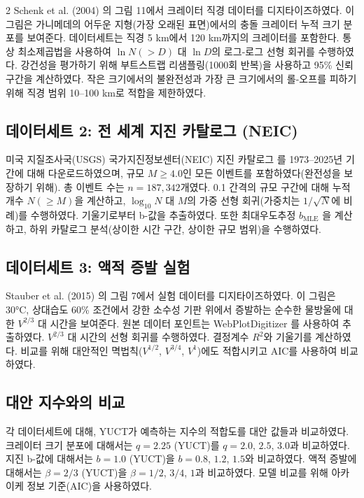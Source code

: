 \documentclass[11pt,a4paper]{article}
\begin{document}
\begin{multicols}{2}
		Schenk et al. (2004) \cite{Schenk2004}의 그림 11에서 크레이터 직경 데이터를 디지타이즈하였다. 이 그림은 가니메데의 어두운 지형(가장 오래된 표면)에서의 충돌 크레이터 누적 크기 분포를 보여준다. 데이터세트는 직경 5 km에서 120 km까지의 크레이터를 포함한다. 통상 최소제곱법을 사용하여 \(\ln N(>D)\) 대 \(\ln D\)의 로그-로그 선형 회귀를 수행하였다. 강건성을 평가하기 위해 부트스트랩 리샘플링(1000회 반복)을 사용하고 95\% 신뢰구간을 계산하였다. 작은 크기에서의 불완전성과 가장 큰 크기에서의 롤-오프를 피하기 위해 직경 범위 10–100 km로 적합을 제한하였다.
		
		\subsection{데이터세트 2: 전 세계 지진 카탈로그 (NEIC)}
		
		미국 지질조사국(USGS) 국가지진정보센터(NEIC) 지진 카탈로그 \cite{USGSNEIC}를 1973–2025년 기간에 대해 다운로드하였으며, 규모 \(M \ge 4.0\)인 모든 이벤트를 포함하였다(완전성을 보장하기 위해). 총 이벤트 수는 \(n = 187,342\)개였다. 0.1 간격의 규모 구간에 대해 누적 개수 \(N(\ge M)\)을 계산하고, \(\log_{10} N\) 대 \(M\)의 가중 선형 회귀(가중치는 \(1/\sqrt{N}\)에 비례)를 수행하였다. 기울기로부터 b-값을 추출하였다. 또한 최대우도추정 \(b_{\text{MLE}}\) \cite{Aki1965}을 계산하고, 하위 카탈로그 분석(상이한 시간 구간, 상이한 규모 범위)을 수행하였다.
		
		\subsection{데이터세트 3: 액적 증발 실험}
		
		Stauber et al. (2015) \cite{Stauber2015}의 그림 7에서 실험 데이터를 디지타이즈하였다. 이 그림은 30°C, 상대습도 60\% 조건에서 강한 소수성 기판 위에서 증발하는 순수한 물방울에 대한 \(V^{2/3}\) 대 시간을 보여준다. 원본 데이터 포인트는 WebPlotDigitizer \cite{WebPlotDigitizer}를 사용하여 추출하였다. \(V^{2/3}\) 대 시간의 선형 회귀를 수행하였다. 결정계수 \(R^2\)와 기울기를 계산하였다. 비교를 위해 대안적인 멱법칙(\(V^{1/2}\), \(V^{3/4}\), \(V^{1}\))에도 적합시키고 AIC를 사용하여 비교하였다.
		
		\subsection{대안 지수와의 비교}
		
		각 데이터세트에 대해, YUCT가 예측하는 지수의 적합도를 대안 값들과 비교하였다. 크레이터 크기 분포에 대해서는 \(q = 2.25\) (YUCT)를 \(q = 2.0\), \(2.5\), \(3.0\)과 비교하였다. 지진 b-값에 대해서는 \(b = 1.0\) (YUCT)을 \(b = 0.8\), \(1.2\), \(1.5\)와 비교하였다. 액적 증발에 대해서는 \(\beta = 2/3\) (YUCT)을 \(\beta = 1/2\), \(3/4\), \(1\)과 비교하였다. 모델 비교를 위해 아카이케 정보 기준(AIC)을 사용하였다.
		

\end{multicols}
\end{document}
